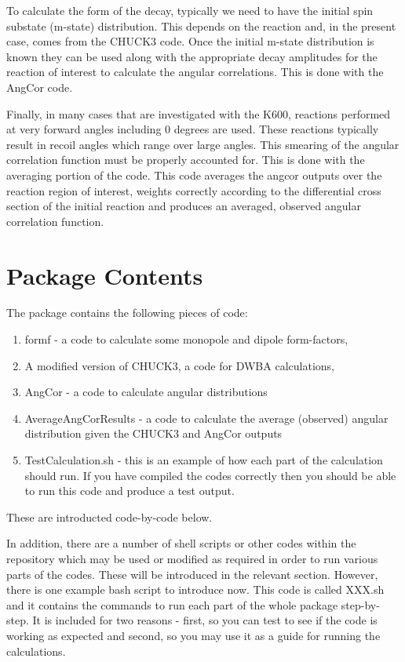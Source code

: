 \documentclass[a4paper,10pt]{article}
\begin{document}
To calculate the form of the decay, typically we need to have the initial spin substate (m-state) distribution. This depends on the reaction and, in the present case, comes from the CHUCK3 code. Once the initial m-state distribution is known they can be used along with the appropriate decay amplitudes for the reaction of interest to calculate the angular correlations. This is done with the AngCor code.

Finally, in many cases that are investigated with the K600, reactions performed at very forward angles including 0 degrees are used. These reactions typically result in recoil angles which range over large angles. This smearing of the angular correlation function must be properly accounted for. This is done with the averaging portion of the code. This code averages the angcor outputs over the reaction region of interest, weights correctly according to the differential cross section of the initial reaction and produces an averaged, observed angular correlation function.

\section{Package Contents}

The package contains the following pieces of code:

\begin{enumerate}
 \item formf - a code to calculate some monopole and dipole form-factors,
 \item A modified version of CHUCK3, a code for DWBA calculations,
 \item AngCor - a code to calculate angular distributions
 \item AverageAngCorResults - a code to calculate the average (observed) angular distribution given the CHUCK3 and AngCor outputs
 \item TestCalculation.sh - this is an example of how each part of the calculation should run. If you have compiled the codes correctly then you should be able to run this code and produce a test output.
\end{enumerate}

These are introducted code-by-code below.

In addition, there are a number of shell scripts or other codes within the repository which may be used or modified as required in order to run various parts of the codes. These will be introduced in the relevant section. However, there is one example bash script to introduce now. This code is called XXX.sh and it contains the commands to run each part of the whole package step-by-step. It is included for two reasons - first, so you can test to see if the code is working as expected and second, so you may use it as a guide for running the calculations.
\end{document}
